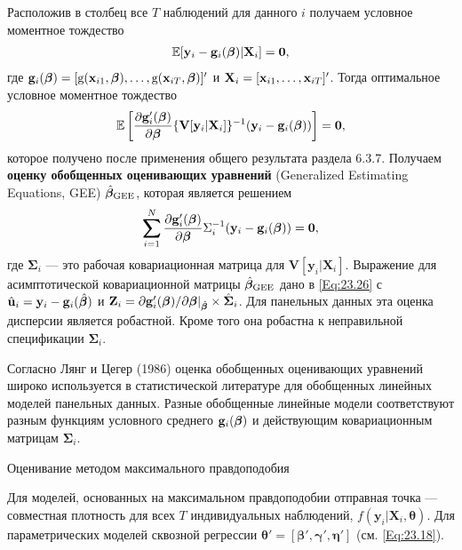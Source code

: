 Расположив в столбец все $T$ наблюдений для данного $i$ получаем условное моментное тождество
\begin{align}
\mathbb{E}[\mathbf{y}_i-\mathbf{g}_i(\bm{\beta})|\mathbf{X}_i]=\mathbf{0,}
\label{Eq:23.28}
\end{align}
где $\mathbf{g}_i (\bm{\beta})=[\mathrm g(\mathbf{x}_{i1},\bm{\beta}), \dots, \mathrm g(\mathbf{x}_{iT},\bm{\beta})]'$  и $\mathbf{X}_i=[\mathbf{x}_{i1}, \dots, \mathbf{x}_{iT}]'$. Тогда оптимальное условное моментное тождество 
\begin{align}
\mathbb{E} \left[ \frac{\partial \mathbf{g}'_i(\bm{\beta})}{\partial\bm{\beta}} \{ \mathbf{V}[\mathbf{y}_i|\mathbf{X}_i] \}^{-1} (\mathbf{y}_i - \mathbf{g}_i(\bm{\beta}))\right]=\mathbf{0},
\label{Eq:23.29}
\end{align}
которое получено после применения общего результата раздела 6.3.7. Получаем \textbf{оценку обобщенных оценивающих уравнений} (Generalized Estimating Equations, GEE) $\hat{\bm{\beta}}_{\mathrm{GEE}}$, которая является решением
\begin{align}
\bm\sum^N_{i=1} \frac{\partial \mathbf{g}'_i(\bm{\beta})}{\partial \bm{\beta}} \Sigma^{-1}_i (\mathbf{y}_i-\mathbf{g}_i(\bm{\beta}))=\mathbf{0},
\label{Eq:23.30} 
\end{align}
где $\bm\Sigma_i$ --- это рабочая ковариационная матрица для $\mathbf{V}[\mathbf{y}_i|\mathbf{X}_i]$. Выражение для асимптотической ковариационной матрицы $\hat{\bm{\beta}}_{\mathrm{GEE}}$ дано в \ref{Eq:23.26} с $\hat{\mathbf{u}}_i=\mathbf{y}_i-\mathbf{g}_i(\hat{\bm{\beta}})$ и $\mathbf{Z}_i=\partial \mathbf{g}'_i(\bm{\beta})/ \partial\bm{\beta} |_{\hat{\bm{\beta}}} \times \hat{\bm\Sigma}_i$. Для панельных данных эта оценка дисперсии является робастной. Кроме того она робастна к неправильной спецификации $\bm\Sigma_i$.

Согласно Лянг и Цегер (1986) оценка обобщенных оценивающих уравнений широко используется в статистической литературе для обобщенных линейных моделей панельных данных. Разные обобщенные линейные модели соответствуют разным функциям условного среднего $\mathbf{g}_i(\bm{\beta})$ и действующим ковариационным матрицам $\bm\Sigma_i$.

{\centering Оценивание методом максимального правдоподобия  \\}

Для моделей, основанных на максимальном правдоподобии отправная точка --- совместная плотность для всех $T$ индивидуальных наблюдений, $f(\mathbf{y}_i|\mathbf{X}_i, \bm\theta)$. Для параметрических моделей сквозной регрессии $\bm\theta'= [\bm\beta', \bm\gamma', \bm\eta']$ (см. \ref{Eq:23.18}).

